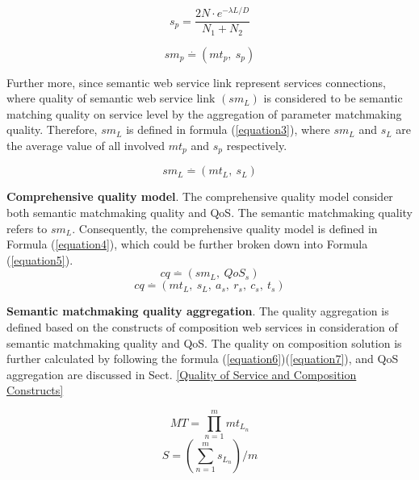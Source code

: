 \documentclass{IEEEtran}
\begin{document}
\begin{equation}
s_{p}{=} \frac{2N \cdot e^{-\lambda L/D} }{N_{1}+N_{2}}
\label{equation1}
\end{equation}

\begin{equation}
\label{equation2}
sm_{p} \stackrel{.}{=} (mt_ {p}, \  s_ {p})
\end{equation}

Further more, since semantic web service link represent services connections, where quality of semantic web service link $(sm_{L})$ is considered to be semantic matching quality on service level by the aggregation of parameter matchmaking quality. Therefore, $sm_{L}$ is defined in formula (\ref{equation3}), where $sm_{L}$ and $s_{L}$ are the average value of all involved $mt_{p}$ and $s_{p}$ respectively. 

\begin{equation}
\label{equation3}
sm_{L} \stackrel{.}{=} (mt_ {L}, \  s_ {L})
\end{equation}

\textbf{Comprehensive quality model}. The comprehensive quality model consider both semantic matchmaking quality and QoS. The semantic matchmaking quality refers to $sm_{L}$. Consequently, the comprehensive quality model is defined in Formula (\ref{equation4}), which could be further broken down into Formula (\ref{equation5}). 
\begin{equation}
\label{equation4}
cq \stackrel{.}{=} (sm_ {L}, \  QoS_ {s})
\end{equation}
\begin{equation}
\label{equation5}
cq \stackrel{.}{=} (mt_ {L}, \  s_ {L}, \  a_{s},\  r_{s},\  c_{s},\  t_{s})
\end{equation}

\textbf{Semantic matchmaking quality aggregation}. The quality aggregation is defined based on the constructs of composition web services in consideration of semantic matchmaking quality and QoS. The quality on composition solution is further calculated by following the formula (\ref{equation6})(\ref{equation7}), and QoS aggregation are discussed in Sect. \ref{Quality of Service and Composition Constructs}

\begin{equation}
\label{equation6}
MT {=} \prod_{n=1}^{m} mt_ {L_{n}}
\end{equation}
\begin{equation}
\label{equation7}
S {=} (\sum_{n=1}^m s_ {L_{n}})/m
\end{equation}
\end{document}
